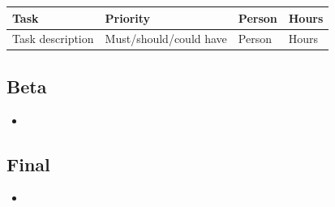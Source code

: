 \documentclass[12pt,notitlepage]{article}
\begin{document}
\begin{tabu}{lXXl}
\toprule
Task & Priority & Person & Hours \\
\midrule
Task description & Must/should/could have & Person & Hours \\
\bottomrule
\end{tabu}

\subsection{Beta}

\begin{itemize}
\item
\end{itemize}

\subsection{Final}
\begin{itemize}
\item
\end{itemize}
\end{document}
